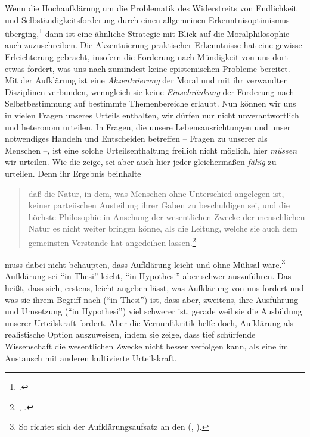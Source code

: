 Wenn die Hochaufklärung um  die
Problematik des Widerstreits von Endlichkeit und Selbständigkeitsforderung durch
einen allgemeinen Erkenntnisoptimismus
überging,\footcite[Vgl.][36]{Engfer:ChristianThomasius1989} dann ist eine
ähnliche Strategie mit Blick auf die Moralphilosophie auch 
zuzuschreiben. Die Akzentuierung praktischer Erkenntnisse
hat eine gewisse Erleichterung gebracht, insofern die Forderung nach Mündigkeit
von uns dort etwas fordert, was uns nach  zumindest keine
epistemischen Probleme bereitet. Mit der Aufklärung ist eine \emph{Akzentuierung} der Moral und mit ihr verwandter
Disziplinen verbunden, wenngleich sie keine \emph{Einschränkung} der
Forderung nach Selbstbestimmung auf bestimmte Themenbereiche erlaubt.
\label{Abschnitt:moralischepistemischerOptimismus-Ende}
Nun können wir uns in vielen Fragen unseres Urteils enthalten, wir dürfen
nur nicht unverantwortlich und heteronom urteilen. In Fragen, die unsere
Lebensausrichtungen und unser notwendiges Handeln und Entscheiden betreffen --
Fragen zu unserer  als Menschen --, ist eine solche
Urteilsenthaltung freilich nicht möglich, hier \emph{müssen} wir urteilen. Wie
die  zeige, sei aber auch hier jeder
gleichermaßen \emph{fähig} zu urteilen. Denn ihr Ergebnis beinhalte
\begin{quote}
daß die Natur, in dem, was Menschen ohne Unterschied angelegen ist, keiner
parteiischen Austeilung ihrer Gaben zu beschuldigen sei, und die höchste
Philosophie in Ansehung der wesentlichen Zwecke der menschlichen Natur es nicht
weiter bringen könne, als die Leitung, welche sie auch dem gemeinsten Verstande
hat angedeihen lassen.\footnote{\cite[][B
859]{Kant:KritikderreinenVernunft2003}, \cite[][III:
538.11--16]{Kant:GesammelteWerke1900ff.}.}
\end{quote}
 muss dabei nicht behaupten, dass Aufklärung leicht und
ohne Mühsal wäre.\footnote{So richtet sich der Aufklärungsaufsatz an den
 \mkbibparens{\cite[vgl.][A
485]{Kant:BeantwortungderFrage:WasistAufklaerung?1977}, \cite[][VIII:
37.11--13]{Kant:GesammelteWerke1900ff.}}.} Aufklärung sei \enquote{in Thesi}
leicht, \enquote{in Hypothesi} aber schwer auszuführen. Das heißt, dass sich,
erstens, leicht angeben lässt, was Aufklärung von uns fordert und was sie ihrem
Begriff nach (\enquote{in Thesi}) ist, dass aber, zweitens, ihre Ausführung und
Umsetzung (\enquote{in Hypothesi}) viel schwerer ist, gerade weil sie die
Ausbildung unserer Urteilskraft fordert. Aber die Vernunftkritik helfe doch,
Aufklärung als realistische Option auszuweisen, indem sie zeige, dass
tief schürfende Wissenschaft die wesentlichen Zwecke nicht besser verfolgen kann,
als eine im Austausch mit anderen kultivierte Urteilskraft.

